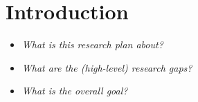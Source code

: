 \section{Introduction}
\label{sec:Introduction}


\begin{itemize}
	\item \emph{What is this research plan about?}
    \item \emph{What are the (high-level) research gaps?}
    \item \emph{What is the overall goal?}
\end{itemize}
